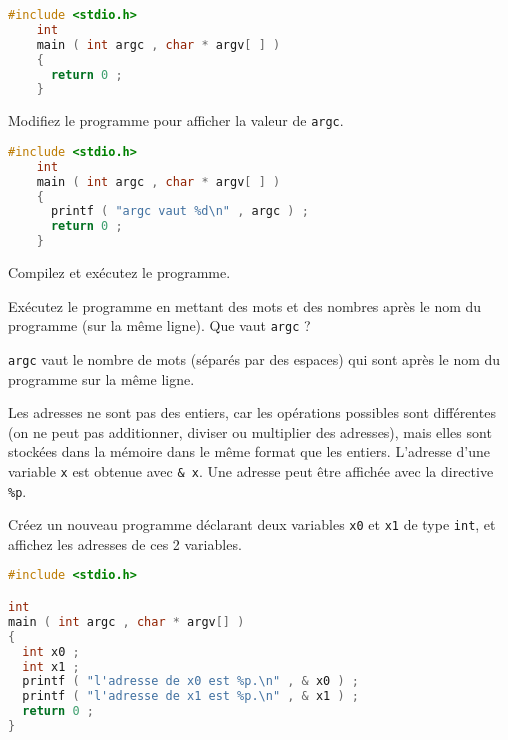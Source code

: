 \begin{solution}
  \begin{lstlisting}[language=C]
    #include <stdio.h>
    int
    main ( int argc , char * argv[ ] )
    {
      return 0 ;
    }
  \end{lstlisting}
\end{solution}

\question Modifiez le programme pour afficher la valeur de \texttt{argc}. 

\begin{solution}
  \begin{lstlisting}[language=C]
    #include <stdio.h>
    int
    main ( int argc , char * argv[ ] )
    {
      printf ( "argc vaut %d\n" , argc ) ;
      return 0 ;
    }
  \end{lstlisting}
\end{solution}

\question Compilez et exécutez le programme.

\question Exécutez le programme en mettant des mots et des nombres
après le nom du programme (sur la même ligne). Que vaut
\texttt{argc} ?

\begin{solution}
  \texttt{argc} vaut le nombre de mots (séparés par des espaces) qui
  sont après le nom du programme sur la même ligne.
\end{solution}


Les adresses ne sont pas des entiers, car les opérations possibles
sont différentes (on ne peut pas additionner, diviser ou multiplier
des adresses), mais elles sont stockées dans la mémoire dans le même
format que les entiers. L'adresse d'une variable \texttt{x} est
obtenue avec \texttt{\& x}. Une adresse peut être affichée avec la
directive \texttt{\%p}.

\question Créez un nouveau programme déclarant deux variables
\texttt{x0} et \texttt{x1} de type \texttt{int}, et affichez les
adresses de ces 2 variables.

\begin{solution}
  \begin{lstlisting}[language=C]
#include <stdio.h>

int
main ( int argc , char * argv[] )
{
  int x0 ;
  int x1 ;
  printf ( "l'adresse de x0 est %p.\n" , & x0 ) ;
  printf ( "l'adresse de x1 est %p.\n" , & x1 ) ;
  return 0 ;
}
  \end{lstlisting}
\end{solution}

